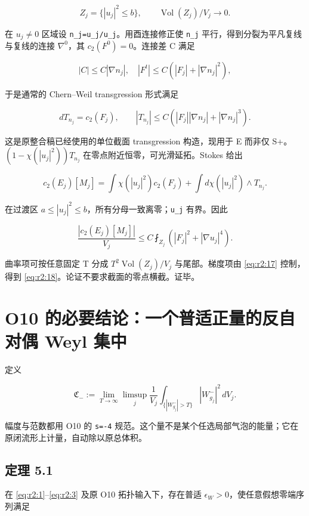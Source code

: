 \documentclass[UTF8,11pt,openany,oneside,fontset=none]{ctexbook}
\begin{document}
\[
 Z_j=\{|u_j|^2\le b\},\qquad \operatorname{Vol}(Z_j)/V_j\to0.
\]

在 \(u_j\ne0\) 区域设 \texttt{n\_j=u\_j/\textbar{}u\_j\textbar{}}。用酉连接修正使 \texttt{n\_j} 平行，得到分裂为平凡复线与复线的连接 \(\nabla^0\)，其 \(c_2(F^0)=0\)。连接差 C 满足

\[
 |C|\le C|\nabla n_j|,\quad
 |F^t|\le C(|F_j|+|\nabla n_j|^2),
\]

于是通常的 Chern--Weil transgression 形式满足

\[
 dT_{n_j}=c_2(F_j),\qquad
 |T_{n_j}|\le C\left(|F_j||\nabla n_j|+|\nabla n_j|^3\right).
 \tag{2.19}\label{eq:r2:19}
\]

这是原整合稿已经使用的单位截面 transgression 构造，现用于 E 而非仅 S+。\((1-\chi(|u_j|^2))T_{n_j}\) 在零点附近恒零，可光滑延拓。Stokes 给出

\[
 c_2(E_j)[M_j]
 =\int\chi(|u_j|^2)c_2(F_j)
 +\int d\chi(|u_j|^2)\wedge T_{n_j}.
 \tag{2.20}\label{eq:r2:20}
\]

在过渡区 \(a\le|u_j|^2\le b\)，所有分母一致离零；\texttt{\textbar{}u\_j\textbar{}} 有界。因此

\[
 \frac{|c_2(E_j)[M_j]|}{V_j}
 \le C\fint_{Z_j}\left(|F_j|^2+|\nabla u_j|^4\right).
 \tag{2.21}\label{eq:r2:21}
\]

曲率项可按任意固定 T 分成 \(T^2\operatorname{Vol}(Z_j)/V_j\) 与尾部。梯度项由 \eqref{eq:r2:17} 控制，得到 \eqref{eq:r2:18}。论证不要求截面的零点横截。证毕。

\section{O10 的必要结论：一个普适正量的反自对偶 Weyl 集中}\label{ch2:o10-ux7684ux5fc5ux8981ux7ed3ux8bbaux4e00ux4e2aux666eux9002ux6b63ux91cfux7684ux53cdux81eaux5bf9ux5076-weyl-ux96c6ux4e2d}

定义

\[
 \mathfrak C_-:=\lim_{T\to\infty}\limsup_j
 \frac1{V_j}\int_{\{|W^-_{g_j}|>T\}}|W^-_{g_j}|^2\,dV_j.
 \tag{2.22}\label{eq:r2:22}
\]

幅度与范数都用 O10 的 \texttt{s=-4} 规范。这个量不是某个任选局部气泡的能量；它在原闭流形上计量，自动除以原总体积。

\subsection{定理 5.1}\label{ch2:ux5b9aux7406-5.1}

在 \eqref{eq:r2:1}--\eqref{eq:r2:3} 及原 O10 拓扑输入下，存在普适 \(\epsilon_W>0\)，使任意假想零端序列满足
\end{document}
